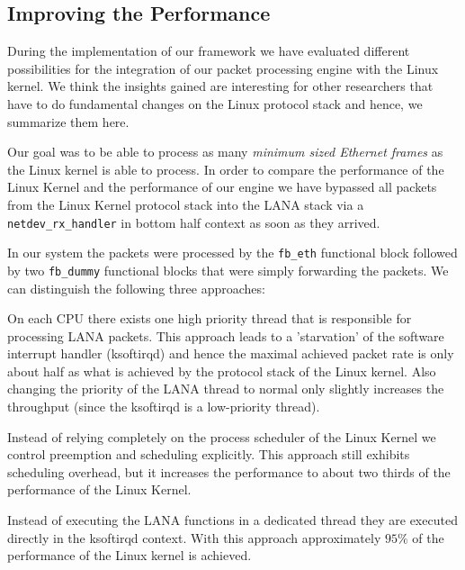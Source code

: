 \documentclass{sig-alternate}
\begin{document}
\subsection{Improving the Performance}
During the implementation of our framework we have evaluated different 
possibilities for the integration of our packet processing engine with the 
Linux kernel. We think the insights gained are interesting for other 
researchers that have to do fundamental changes on the Linux protocol stack 
and hence, we summarize them here.

Our goal was to be able to process as many \textit{minimum sized Ethernet frames} 
as the Linux kernel is able to process. In order to compare the performance of 
the Linux Kernel and the performance of our engine we have bypassed all packets 
from the Linux Kernel protocol stack into the LANA stack via a
\texttt{netdev\_rx\_handler} in bottom half context as soon as they arrived.

In our system the packets were processed by the \texttt{fb\_eth} functional 
block followed by two \texttt{fb\_dummy} functional blocks that were simply 
forwarding the packets. We can distinguish the following three approaches:
\begin{compactitem}
\item On each CPU there exists one high priority thread that is responsible 
      for processing LANA packets. This approach leads to a 'starvation' of 
      the software interrupt handler (ksoftirqd) and hence the maximal achieved 
      packet rate is only about half as what is achieved by the protocol 
      stack of the Linux kernel. Also changing the priority of the LANA 
      thread to normal only slightly increases the throughput (since the 
      ksoftirqd is a low-priority thread).
\item Instead of relying completely on the process scheduler of the 
      Linux Kernel we control preemption and scheduling explicitly. This 
      approach still exhibits scheduling overhead, but it increases the 
      performance to about two thirds of the performance of the Linux 
      Kernel.
\item Instead of executing the LANA functions in a dedicated thread they 
      are executed directly in the ksoftirqd context. With this approach 
      approximately $95\%$ of the performance of the Linux kernel is achieved.
\end{compactitem}
\end{document}
